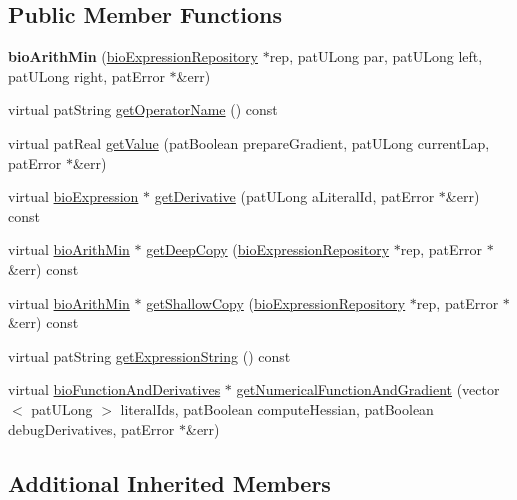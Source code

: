 \subsection*{Public Member Functions}
\begin{DoxyCompactItemize}
\item 
\mbox{\label{classbio_arith_min_a8d9b751c23988972cd7523717953e2a8}} 
{\bfseries bio\+Arith\+Min} (\hyperlink{classbio_expression_repository}{bio\+Expression\+Repository} $\ast$rep, pat\+U\+Long par, pat\+U\+Long left, pat\+U\+Long right, pat\+Error $\ast$\&err)
\item 
virtual pat\+String \hyperlink{classbio_arith_min_a09b89bea022328daada894ebdf834e5c}{get\+Operator\+Name} () const
\item 
virtual pat\+Real \hyperlink{classbio_arith_min_a809fd63d92823ab01e0a6af0192c5d2e}{get\+Value} (pat\+Boolean prepare\+Gradient, pat\+U\+Long current\+Lap, pat\+Error $\ast$\&err)
\item 
virtual \hyperlink{classbio_expression}{bio\+Expression} $\ast$ \hyperlink{classbio_arith_min_a385882099c9d71855493b6aa4b6223e1}{get\+Derivative} (pat\+U\+Long a\+Literal\+Id, pat\+Error $\ast$\&err) const
\item 
virtual \hyperlink{classbio_arith_min}{bio\+Arith\+Min} $\ast$ \hyperlink{classbio_arith_min_a2d083461d7be9f1c5abac00fe4066a37}{get\+Deep\+Copy} (\hyperlink{classbio_expression_repository}{bio\+Expression\+Repository} $\ast$rep, pat\+Error $\ast$\&err) const
\item 
virtual \hyperlink{classbio_arith_min}{bio\+Arith\+Min} $\ast$ \hyperlink{classbio_arith_min_a30ded7c95902dd535ba172b2bd4918de}{get\+Shallow\+Copy} (\hyperlink{classbio_expression_repository}{bio\+Expression\+Repository} $\ast$rep, pat\+Error $\ast$\&err) const
\item 
virtual pat\+String \hyperlink{classbio_arith_min_a22f4182d45d18801a763fb1d3d4579a3}{get\+Expression\+String} () const
\item 
virtual \hyperlink{classbio_function_and_derivatives}{bio\+Function\+And\+Derivatives} $\ast$ \hyperlink{classbio_arith_min_aeeb85ace337c2e2f0b8e6a27a698625a}{get\+Numerical\+Function\+And\+Gradient} (vector$<$ pat\+U\+Long $>$ literal\+Ids, pat\+Boolean compute\+Hessian, pat\+Boolean debug\+Derivatives, pat\+Error $\ast$\&err)
\end{DoxyCompactItemize}
\subsection*{Additional Inherited Members}


